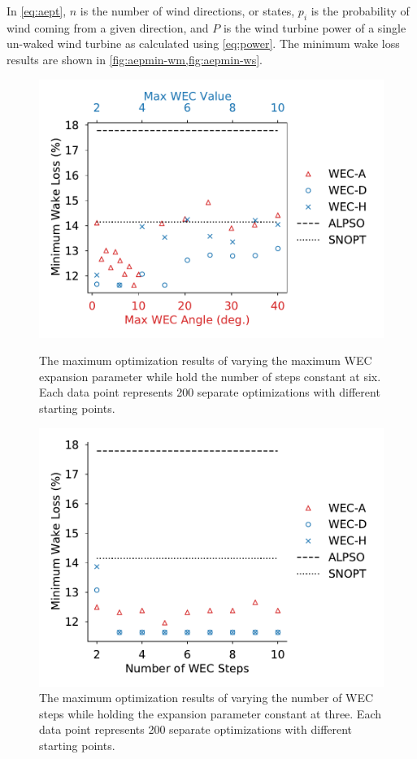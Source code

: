 \documentclass[a4paper]{jpconf}
\begin{document}
 In \cref{eq:aept}, $n$ is the number of wind directions, or states, $p_i$ is the probability of wind coming from a given direction, and $P$ is the wind turbine power of a single un-waked wind turbine as calculated using \cref{eq:power}. The minimum wake loss results are shown in \cref{fig:aepmin-wm,fig:aepmin-ws}.
%
\begin{figure}[ht]
	\centering
	\begin{minipage}[t]{0.47\textwidth}
		\centering
		\includegraphics[width=\textwidth, trim={0cm 0cm 0cm 0cm}, clip]{maxwec_const_nsteps6_min}
		\caption{The maximum optimization results of varying the maximum WEC expansion parameter while hold the number of steps constant at six. Each data point represents 200 separate optimizations with different starting points.}
		\label{fig:aepmin-wm}
	\end{minipage}\hspace{1pc}
	\begin{minipage}[t]{0.47\textwidth}
		\centering
		\includegraphics[width=\textwidth]{nsteps_const_maxwec_min}
		\caption{The maximum optimization results of varying the number of WEC steps while holding the expansion parameter constant at three. Each data point represents 200 separate optimizations with different starting points.}
		\label{fig:aepmin-ws}
	\end{minipage}
\end{figure}
\end{document}
